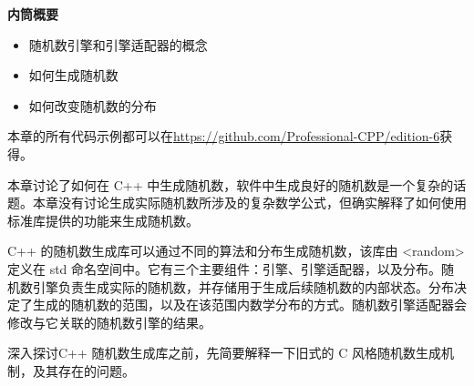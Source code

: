 \noindent
\textbf{内筒概要}

\begin{itemize}
\item
随机数引擎和引擎适配器的概念

\item
如何生成随机数

\item
如何改变随机数的分布
\end{itemize}

本章的所有代码示例都可以在\url{https://github.com/Professional-CPP/edition-6}获得。

本章讨论了如何在 C++ 中生成随机数，软件中生成良好的随机数是一个复杂的话题。本章没有讨论生成实际随机数所涉及的复杂数学公式，但确实解释了如何使用标准库提供的功能来生成随机数。

C++ 的随机数生成库可以通过不同的算法和分布生成随机数，该库由 <random> 定义在 std 命名空间中。它有三个主要组件：引擎、引擎适配器，以及分布。随机数引擎负责生成实际的随机数，并存储用于生成后续随机数的内部状态。分布决定了生成的随机数的范围，以及在该范围内数学分布的方式。随机数引擎适配器会修改与它关联的随机数引擎的结果。

深入探讨C++ 随机数生成库之前，先简要解释一下旧式的 C 风格随机数生成机制，及其存在的问题。










